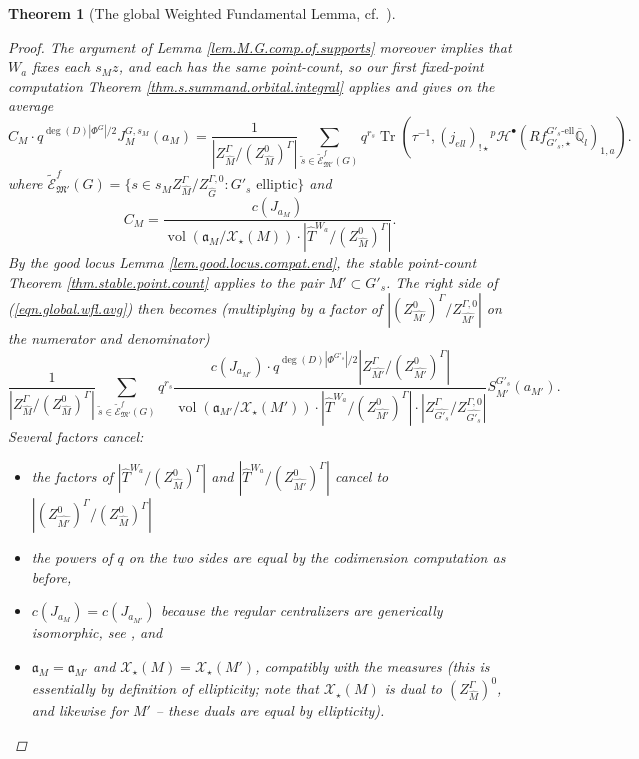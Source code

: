 \documentclass[openany]{amsbook}
\newtheorem{theorem}{Theorem}[chapter]
\theoremstyle{definition}
\theoremstyle{remark}
\numberwithin{equation}{section}
\newcommand{\Q}{\mathbb{Q}}
\newcommand{\cE}{\mathcal{E}}
\newcommand{\cX}{\mathcal{X}}
\newcommand{\ol}[1]{\overline{#1}}
\newcommand{\Tr}{\operatorname{Tr }}
\newcommand{\vol}{\operatorname{vol}}
\renewcommand{\-}{\operatorname{-}}
\renewcommand{\a}{\mathfrak{a}}
\newcommand{\pH}{{}^p \mathcal{H}}
\newcommand{\wtilde}[1]{\widetilde{#1}}
\newcommand{\el}{\text{-ell}}
\newcommand{\fM}{\mathfrak{M}}
\begin{document}
\begin{theorem}[{The global Weighted Fundamental Lemma, cf.\ \cite[Th\'eor\`eme 15.1.1]{CLII}}]
\begin{proof}
    The argument of Lemma \ref{lem.M.G.comp.of.supports} moreover implies that $W_a$ fixes each $s_M z$, and each has the same point-count, so our first fixed-point computation Theorem \ref{thm.s.summand.orbital.integral} applies and gives on the average
    \begin{equation}
        C_M \cdot q^{\deg(D) |\Phi^G|/2} J_M^{G,{s_M}}(a_M) = \frac{1}{|Z_{\widehat{M}}^\Gamma/(Z^0_{\widehat{M}})^\Gamma|} \sum_{\wtilde{s} \in \wtilde{\cE}_{\fM'}^f(G)} q^{r_s} \Tr(\tau^{-1}, (j_{ell})_{!\star} \pH^\bullet(R f_{G'_s, \star}^{G'_s\el} \ol{\Q}_l)_{1,a}).\label{eqn.global.wfl.avg}
    \end{equation}
    where $\wtilde{\cE}_{\fM'}^f(G) = \{s \in s_M Z^\Gamma_{\widehat{M}}/Z_{\widehat{G}}^{\Gamma,0} : G'_s \text{ elliptic}\}$ and
    $$
        C_M = \frac{c(J_{a_M})}{\vol(\a_M/\cX_\star(M)) \cdot |\widehat{T}^{W_a}/(Z^0_{\widehat{M}})^{\Gamma}|}.
    $$
    By the good locus Lemma \ref{lem.good.locus.compat.end}, the stable point-count Theorem \ref{thm.stable.point.count} applies to the pair $M' \subset G'_s$. The right side of (\ref{eqn.global.wfl.avg}) then becomes (multiplying by a factor of $|(Z^0_{\widehat{M'}})^\Gamma/Z_{\widehat{M'}}^{\Gamma,0}|$ on the numerator and denominator)
    $$
        \frac{1}{|Z_{\widehat{M}}^\Gamma/(Z^0_{\widehat{M}})^\Gamma|} \sum_{\wtilde{s} \in \wtilde{\cE}_{\fM'}^f(G)} q^{r_s} \frac{c(J_{a_{M'}}) \cdot q^{\deg(D) |\Phi^{G'_s}|/2} |Z^\Gamma_{\widehat{M'}}/(Z^0_{\widehat{M'}})^\Gamma|}
        {\vol(\a_{M'}/\cX_\star(M')) \cdot |\widehat{T}^{W_a}/(Z_{\widehat{M'}}^0)^\Gamma| \cdot |Z^\Gamma_{\widehat{G'_s}}/Z^{\Gamma,0}_{\widehat{G'_s}}|} S_{M'}^{G'_s}(a_{M'}).
    $$
    Several factors cancel:
    \begin{itemize} 
        \item the factors of $|\widehat{T}^{W_a}/(Z^0_{\widehat{M}})^{\Gamma}|$ and $|\widehat{T}^{W_a}/(Z_{\widehat{M'}}^0)^\Gamma|$ cancel to $|(Z^0_{\widehat{M'}})^{\Gamma}/(Z^0_{\widehat{M}})^{\Gamma}|$
    \item the powers of $q$ on the two sides are equal by the codimension computation as before, 
    \item $c(J_{a_M}) = c(J_{a_{M'}})$ because the regular centralizers are generically isomorphic, see \cite[Proposition 2.5.1]{ngofl}, and
    \item $\a_M = \a_{M'}$ and $\cX_\star(M) = \cX_\star(M')$, compatibly with the measures (this is essentially by definition of ellipticity; note that $\cX_\star(M)$ is dual to $(Z_{\widehat{M}}^\Gamma)^0$, and likewise for $M'$ -- these duals are equal by ellipticity). 

\end{itemize}
\end{proof}
\end{theorem}
\end{document}
